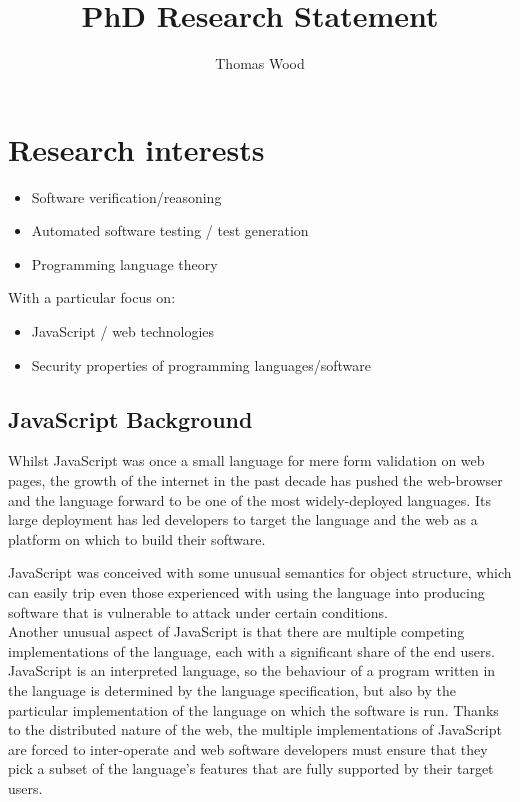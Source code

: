\documentclass[a4paper]{article}
\title{PhD Research Statement}
\author{Thomas Wood}
\date{}
\begin{document}
\maketitle

\section{Research interests}
\begin{itemize}
\item Software verification/reasoning
\item Automated software testing / test generation
\item Programming language theory
\end{itemize}
With a particular focus on:
\begin{itemize}
\item JavaScript / web technologies
\item Security properties of programming languages/software
\end{itemize}

\subsection{JavaScript Background}
Whilst JavaScript was once a small language for mere form validation on web
pages, the growth of the internet in the past decade has pushed the web-browser
and the language forward to be one of the most widely-deployed languages.
Its large deployment has led developers to target the language and the web as a
platform on which to build their software. %

JavaScript was conceived with some unusual semantics for object structure, which
can easily trip even those experienced with
using the language into producing software that is vulnerable to attack under
certain conditions.
\\

Another unusual aspect of JavaScript is that there are multiple competing
implementations of the language, each with a significant share of the end users.
JavaScript is an interpreted language, so the behaviour of a program written in
the language is determined by the language specification, but also by
the particular implementation of the language on which the software is
run. Thanks to the distributed nature of the web, the multiple implementations
of JavaScript are forced to inter-operate and web software developers must
ensure that they pick a subset of the language's features that are fully
supported by their target users.
\end{document}
